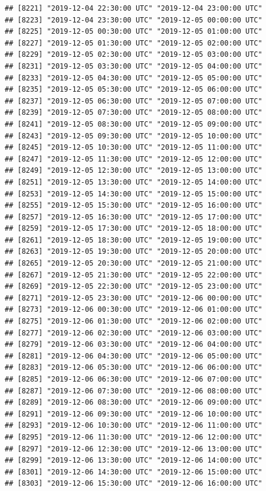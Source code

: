 \documentclass{article}\usepackage[]{graphicx}\usepackage[]{color}
\makeatletter
\newenvironment{kframe}{%
 \def\at@end@of@kframe{}%
 \ifinner\ifhmode%
  \def\at@end@of@kframe{\end{minipage}}%
  \begin{minipage}{\columnwidth}%
 \fi\fi%
 \def\FrameCommand##1{\hskip\@totalleftmargin \hskip-\fboxsep
 \colorbox{shadecolor}{##1}\hskip-\fboxsep
     \hskip-\linewidth \hskip-\@totalleftmargin \hskip\columnwidth}%
 \MakeFramed {\advance\hsize-\width
   \@totalleftmargin\z@ \linewidth\hsize
   \@setminipage}}%
 {\par\unskip\endMakeFramed%
 \at@end@of@kframe}
\newenvironment{knitrout}{}{} %
\makeatother
\begin{document}
\begin{knitrout}
\begin{kframe}
\begin{verbatim}
## [8221] "2019-12-04 22:30:00 UTC" "2019-12-04 23:00:00 UTC"
## [8223] "2019-12-04 23:30:00 UTC" "2019-12-05 00:00:00 UTC"
## [8225] "2019-12-05 00:30:00 UTC" "2019-12-05 01:00:00 UTC"
## [8227] "2019-12-05 01:30:00 UTC" "2019-12-05 02:00:00 UTC"
## [8229] "2019-12-05 02:30:00 UTC" "2019-12-05 03:00:00 UTC"
## [8231] "2019-12-05 03:30:00 UTC" "2019-12-05 04:00:00 UTC"
## [8233] "2019-12-05 04:30:00 UTC" "2019-12-05 05:00:00 UTC"
## [8235] "2019-12-05 05:30:00 UTC" "2019-12-05 06:00:00 UTC"
## [8237] "2019-12-05 06:30:00 UTC" "2019-12-05 07:00:00 UTC"
## [8239] "2019-12-05 07:30:00 UTC" "2019-12-05 08:00:00 UTC"
## [8241] "2019-12-05 08:30:00 UTC" "2019-12-05 09:00:00 UTC"
## [8243] "2019-12-05 09:30:00 UTC" "2019-12-05 10:00:00 UTC"
## [8245] "2019-12-05 10:30:00 UTC" "2019-12-05 11:00:00 UTC"
## [8247] "2019-12-05 11:30:00 UTC" "2019-12-05 12:00:00 UTC"
## [8249] "2019-12-05 12:30:00 UTC" "2019-12-05 13:00:00 UTC"
## [8251] "2019-12-05 13:30:00 UTC" "2019-12-05 14:00:00 UTC"
## [8253] "2019-12-05 14:30:00 UTC" "2019-12-05 15:00:00 UTC"
## [8255] "2019-12-05 15:30:00 UTC" "2019-12-05 16:00:00 UTC"
## [8257] "2019-12-05 16:30:00 UTC" "2019-12-05 17:00:00 UTC"
## [8259] "2019-12-05 17:30:00 UTC" "2019-12-05 18:00:00 UTC"
## [8261] "2019-12-05 18:30:00 UTC" "2019-12-05 19:00:00 UTC"
## [8263] "2019-12-05 19:30:00 UTC" "2019-12-05 20:00:00 UTC"
## [8265] "2019-12-05 20:30:00 UTC" "2019-12-05 21:00:00 UTC"
## [8267] "2019-12-05 21:30:00 UTC" "2019-12-05 22:00:00 UTC"
## [8269] "2019-12-05 22:30:00 UTC" "2019-12-05 23:00:00 UTC"
## [8271] "2019-12-05 23:30:00 UTC" "2019-12-06 00:00:00 UTC"
## [8273] "2019-12-06 00:30:00 UTC" "2019-12-06 01:00:00 UTC"
## [8275] "2019-12-06 01:30:00 UTC" "2019-12-06 02:00:00 UTC"
## [8277] "2019-12-06 02:30:00 UTC" "2019-12-06 03:00:00 UTC"
## [8279] "2019-12-06 03:30:00 UTC" "2019-12-06 04:00:00 UTC"
## [8281] "2019-12-06 04:30:00 UTC" "2019-12-06 05:00:00 UTC"
## [8283] "2019-12-06 05:30:00 UTC" "2019-12-06 06:00:00 UTC"
## [8285] "2019-12-06 06:30:00 UTC" "2019-12-06 07:00:00 UTC"
## [8287] "2019-12-06 07:30:00 UTC" "2019-12-06 08:00:00 UTC"
## [8289] "2019-12-06 08:30:00 UTC" "2019-12-06 09:00:00 UTC"
## [8291] "2019-12-06 09:30:00 UTC" "2019-12-06 10:00:00 UTC"
## [8293] "2019-12-06 10:30:00 UTC" "2019-12-06 11:00:00 UTC"
## [8295] "2019-12-06 11:30:00 UTC" "2019-12-06 12:00:00 UTC"
## [8297] "2019-12-06 12:30:00 UTC" "2019-12-06 13:00:00 UTC"
## [8299] "2019-12-06 13:30:00 UTC" "2019-12-06 14:00:00 UTC"
## [8301] "2019-12-06 14:30:00 UTC" "2019-12-06 15:00:00 UTC"
## [8303] "2019-12-06 15:30:00 UTC" "2019-12-06 16:00:00 UTC"

\end{verbatim}
\end{kframe}
\end{knitrout}
\end{document}
